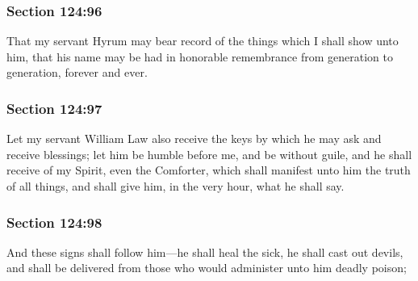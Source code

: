 	\subsubsection{Section 124:96} %
		\label{DC124-96}

		That my servant Hyrum may bear record of the things which I shall show unto him, that his name may be had in honorable remembrance from generation to generation, forever and ever.


	\subsubsection{Section 124:97} %
		\label{DC124-97}

		Let my servant William Law also receive the keys by which he may ask and receive blessings; let him be humble before me, and be without guile, and he shall receive of my Spirit, even the Comforter, which shall manifest unto him the truth of all things, and shall give him, in the very hour, what he shall say.


	\subsubsection{Section 124:98} %
		\label{DC124-98}

		And these signs shall follow him---he shall heal the sick, he shall cast out devils, and shall be delivered from those who would administer unto him deadly poison;


